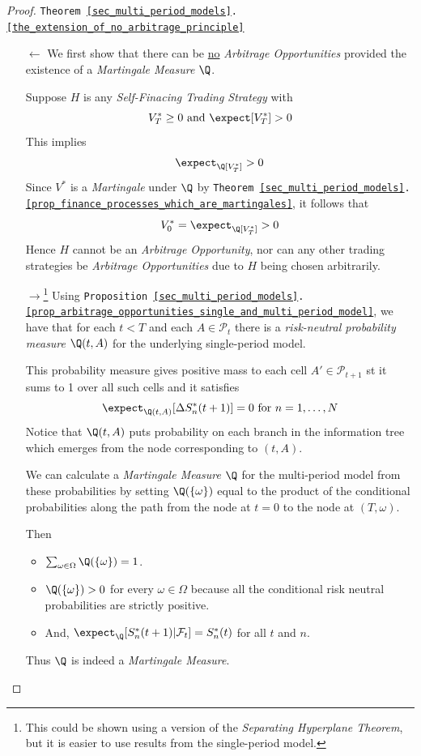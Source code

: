 \documentclass[11pt,a4paper]{article}
\begin{document}
  \begin{proof}{\texttt{Theorem \ref{sec_multi_period_models}.\ref{the_extension_of_no_arbitrage_principle}}}
    \begin{itemize}
      \item[$\longleftarrow$] We first show that there can be \underline{no} \textit{Arbitrage Opportunities} provided the existence of a \textit{Martingale Measure} $\Q$.
      \par Suppose $H$ is any \textit{Self-Finacing Trading Strategy} with
      \[ V_T^*\geq0\text{ and }\expect[V_T^*]>0 \]
      This implies
      \[ \expect_\Q[V_T^*]>0 \]
      Since $V^*$ is a \textit{Martingale} under $\Q$ by \texttt{Theorem \ref{sec_multi_period_models}.\ref{prop_finance_processes_which_are_martingales}}, it follows that
      \[ V_0^*=\expect_\Q[V_T^*]>0 \]
      Hence $H$ cannot be an \textit{Arbitrage Opportunity}, nor can any other trading strategies be \textit{Arbitrage Opportunities} due to $H$ being chosen arbitrarily.
      \item[$\longrightarrow$\footnote{This could be shown using a version of the \textit{Separating Hyperplane Theorem}, but it is easier to use results from the single-period model.}] Using \texttt{Proposition \ref{sec_multi_period_models}.\ref{prop_arbitrage_opportunities_single_and_multi_period_model}}, we have that for each $t<T$ and each $A\in\mathcal{P}_t$ there is a \textit{risk-neutral probability measure} $\Q(t,A)$ for the underlying single-period model.
      \par This probability measure gives positive mass to each cell $A'\in\mathcal{P}_{t+1}$ st it sums to 1 over all such cells and it satisfies
      \[ \expect_{\Q(t,A)}[\Delta S_n^*(t+1)]=0\text{ for }n=1,\dots,N \]
      Notice that $\Q(t,A)$ puts probability on each branch in the information tree which emerges from the node corresponding to $(t,A)$.
      \par We can calculate a \textit{Martingale Measure} $\Q$ for the multi-period model from these probabilities by setting $\Q(\{\omega\})$ equal to the product of the conditional probabilities along the path from the node at $t=0$ to the node at $(T,\omega)$.
      \par Then
      \begin{itemize}
        \item $\sum_{\omega\in\Omega}\Q(\{\omega\})=1$.
        \item $\Q(\{\omega\})>0$ for every $\omega\in\Omega$ because all the conditional risk neutral probabilities are strictly positive.
        \item And, $\expect_\Q[S_n^*(t+1)|\mathcal{F}_t]=S_n^*(t)$ for all $t$ and $n$.
      \end{itemize}
      Thus $\Q$ is indeed a \textit{Martingale Measure}.\proved
    \end{itemize}
  \end{proof}
\end{document}
